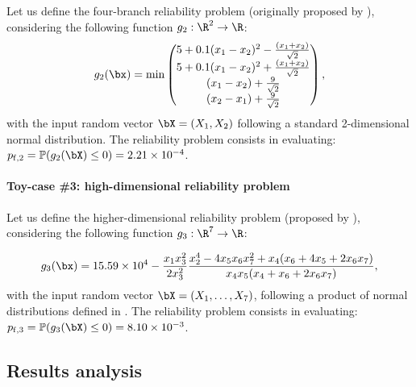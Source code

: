 Let us define the four-branch reliability problem (originally proposed by \cite{waarts2000structural}), considering the following function $g_2: \R^2 \rightarrow \R$:
\begin{align}
  g_2(\bx) = \min \begin{pmatrix}
    5+0.1(x_1-x_2)^2-\frac{(x_1+x_2)}{\sqrt{2}}\\
    5+0.1(x_1-x_2)^2+\frac{(x_1+x_2)}{\sqrt{2}}\\
    (x_1-x_2)+ \frac{9}{\sqrt{2}}\\
    (x_2-x_1)+ \frac{9}{\sqrt{2}}
  \end{pmatrix},
\end{align}
with the input random vector $\bX = (X_1, X_2)$ following a standard 2-dimensional normal distribution. 
The reliability problem consists in evaluating: $p_{\mathrm{f}, 2} = \mathbb{P} ( g_2(\bX) \leq 0 ) =  2.21 \times 10^{-4}$.

\paragraph{Toy-case \#3: high-dimensional reliability problem}

Let us define the higher-dimensional reliability problem (proposed by \cite{yun2018efficient}), considering the following function $g_3 : \R^7 \rightarrow \R$:

\begin{equation}
    g_3(\bx) = 15.59 \times 10^4 - \frac{x_1 x_3^2}{2 x_3^2} \frac{x_2^4 - 4 x_5 x_6 x_7^2 + x_4 (x_6 + 4 x_5 + 2 x_6 x_7)}{x_4 x_5 (x_4 + x_6 + 2 x_6 x_7)},
\end{equation}
with the input random vector $\bX = (X_1, \dots, X_7)$, following a product of normal distributions defined in \cite{yun2018efficient}. 
The reliability problem consists in evaluating: $p_{\mathrm{f}, 3} = \mathbb{P} ( g_3(\bX) \leq 0 ) =  8.10 \times 10^{-3}$.


\subsection{Results analysis}


